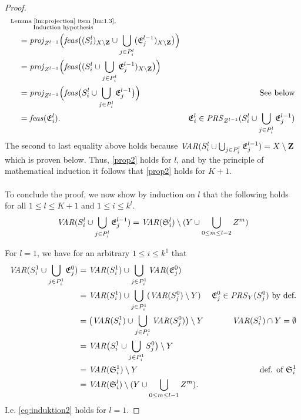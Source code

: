 \begin{proof}
\begin{align*}
&\substack{\text{Lemma~\ref{lm:projection} item \ref{lm:1.3}},\\\text{Induction hypothesis}}\\
&\quad = \mathit{proj}_{Z^{l-1}}\Big(\mathit{feas}\big((S^l_i)_{X\setminus\mathbf{Z}}\cup\bigcup_{j\in P^l_i}(\mathfrak{E}^{l-1}_j)_{X\setminus \mathbf{Z}}\big)\Big)\\
&\quad = \mathit{proj}_{Z^{l-1}}\Big(\mathit{feas}\big((S^l_i\cup\bigcup_{j\in P^l_i}\mathfrak{E}^{l-1}_j)_{X\setminus \mathbf{Z}}\big)\Big)\\
&\quad = \mathit{proj}_{Z^{l-1}}\Big(\mathit{feas}\big(S^l_i\cup\bigcup_{j\in P^l_i}\mathfrak{E}^{l-1}_j\big)\Big)&\text{See below}\\
&\quad = \mathit{feas}(\mathfrak{E}^l_i).&\mathfrak{E}^l_i\in \mathit{PRS}_{Z^{l-1}}(S^l_i\cup\bigcup_{j\in P^l_i}\mathfrak{E}^{l-1}_j)
\end{align*}
The second to last equality above holds because $\mathit{VAR}(S^l_i \cup\bigcup_{j\in P^l_i}\mathfrak{E}^{l-1}_j )= X\setminus\mathbf{Z}$ which is proven below.
Thus, \eqref{prop2} holds for $l$, and by the principle of mathematical induction it follows that \eqref{prop2} holds for $K+1$.
\\\\
To conclude the proof, we now show by induction on $l$ that the following holds for all $1\leq l\leq K+1$ and $1\leq i\leq k^l$.
\begin{equation}\label{eq:induktion2}
\mathit{VAR}(S^l_i \cup\bigcup_{j\in P^l_i}\mathfrak{E}^{l-1}_j )= \mathit{VAR}(\mathfrak{S}^l_i)\setminus (Y\cup\bigcup_{0\leq m\leq l-2} Z^m)
\end{equation}

For $l = 1$, we have for an arbitrary $1\leq i\leq k^1$ that 
\begin{align*}
\mathit{VAR}(S^1_i \cup\bigcup_{j\in P^1_i}\mathfrak{E}^0_j) 
& = \mathit{VAR}(S^1_i) \cup\bigcup_{j\in P^1_i}\mathit{VAR}(\mathfrak{E}^0_j) \\
& = \mathit{VAR}(S^1_i) \cup\bigcup_{j\in P^1_i}(\mathit{VAR}(S^0_j)\setminus Y) &\mathfrak{E}^0_j\in\mathit{PRS}_Y(S^0_j)\text{ by def.}\\
& = \big(\mathit{VAR}(S^1_i) \cup\bigcup_{j\in P^1_i}\mathit{VAR}(S^0_j)\big)\setminus Y & \mathit{VAR}(S^1_i) \cap Y = \emptyset\\  
& = \mathit{VAR}\big(S^1_i \cup\bigcup_{j\in P^1_i}S^0_j\big)\setminus Y\\  
& = \mathit{VAR}(\mathfrak{S}^1_i)\setminus Y & \text{def. of } \mathfrak{S}^1_i\\  
& = \mathit{VAR}(\mathfrak{S}^l_i)\setminus (Y\cup\bigcup_{0\leq m\leq l-1} Z^m).
\end{align*}
I.e. \eqref{eq:induktion2} holds for $l=1$.


\end{proof}
